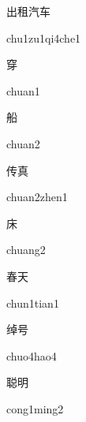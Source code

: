 \begin{multicols*}{2}
\begin{verbete}{出租汽车}
\begin{pronuncia}{chu1zu1qi4che1}
\end{pronuncia}
\end{verbete}

\begin{verbete}[chuan1]{穿}
\begin{pronuncia}{chuan1}
\end{pronuncia}
\end{verbete}

\begin{verbete}[chuan2]{船}
\begin{pronuncia}{chuan2}
\end{pronuncia}
\end{verbete}

\begin{verbete}{传真}
\begin{pronuncia}{chuan2zhen1}
\end{pronuncia}
\end{verbete}

\begin{verbete}[chuang2]{床}
\begin{pronuncia}{chuang2}
\end{pronuncia}
\end{verbete}

\begin{verbete}{春天}
\begin{pronuncia}{chun1tian1}
\end{pronuncia}
\end{verbete}

\begin{verbete}{绰号}
\begin{pronuncia}{chuo4hao4}
\end{pronuncia}
\end{verbete}

\begin{verbete}{聪明}
\begin{pronuncia}{cong1ming2}
\end{pronuncia}
\end{verbete}


\end{multicols*}
